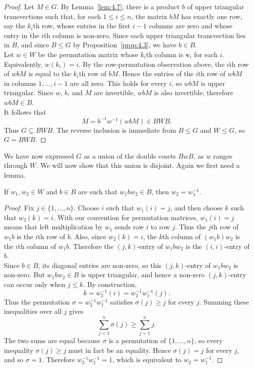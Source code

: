 \documentclass[../Odyssey_Project.tex]{subfiles}
\begin{document}
\begin{proof}
Let $M\in G$. By Lemma~\ref{lem:4.7}, there is a product $b$ of upper triangular transvections such that, for each $1\leq i\leq n$, the matrix $bM$ has exactly one row, say the $k_i$th row, whose entries in the first $i-1$ columns are zero and whose entry in the $i$th column is non-zero. Since each upper triangular transvection lies in $B$, and since $B\leq G$ by Proposition~\ref{prop:4.3}, we have $b\in B$.\\
Let $w\in W$ be the permutation matrix whose $k_i$th column is $\mathbf{v}_i$ for each $i$. Equivalently, $w(k_i)=i$. By the row-permutation observation above, the $i$th row of $wbM$ is equal to the $k_i$th row of $bM$. Hence the entries of the $i$th row of $wbM$ in columns $1,\ldots,i-1$ are all zero. This holds for every $i$, so $wbM$ is upper triangular. Since $w$, $b$, and $M$ are invertible, $wbM$ is also invertible; therefore $wbM\in B$.\\
It follows that
\[
    M=b^{-1}w^{-1}(wbM)\in BWB.
\]
Thus $G\subseteq BWB$. The reverse inclusion is immediate from $B\leq G$ and $W\leq G$, so $G=BWB$.
\end{proof}
We have now expressed $G$ as a union of the double cosets $BwB$, as $w$ ranges through $W$. We will now show that this union is disjoint. Again we first need a lemma.

\begin{lemma}
\label{lem:4.8}
If $w_1, w_2 \in W$ and $b \in B$ are such that $w_1 b w_2 \in B$, then $w_2 = w_1^{-1}$.
\end{lemma}

\begin{proof}
Fix $j\in\{1,\ldots,n\}$. Choose $i$ such that $w_1(i)=j$, and then choose $k$ such that $w_2(k)=i$. With our convention for permutation matrices, $w_1(i)=j$ means that left multiplication by $w_1$ sends row $i$ to row $j$. Thus the $j$th row of $w_1b$ is the $i$th row of $b$. Also, since $w_2(k)=i$, the $k$th column of $(w_1b)w_2$ is the $i$th column of $w_1b$. Therefore the $(j,k)$-entry of $w_1bw_2$ is the $(i,i)$-entry of $b$.\\
Since $b\in B$, its diagonal entries are non-zero, so this $(j,k)$-entry of $w_1bw_2$ is non-zero. But $w_1bw_2\in B$ is upper triangular, and hence a non-zero $(j,k)$-entry can occur only when $j\leq k$. By construction,
\[
    k=w_2^{-1}(i)=w_2^{-1}w_1^{-1}(j).
\]
Thus the permutation $\sigma=w_2^{-1}w_1^{-1}$ satisfies $\sigma(j)\geq j$ for every $j$. Summing these inequalities over all $j$ gives
\[
    \sum_{j=1}^n \sigma(j)\geq \sum_{j=1}^n j.
\]
The two sums are equal because $\sigma$ is a permutation of $\{1,\ldots,n\}$, so every inequality $\sigma(j)\geq j$ must in fact be an equality. Hence $\sigma(j)=j$ for every $j$, and so $\sigma=1$. Therefore $w_2^{-1}w_1^{-1}=1$, which is equivalent to $w_2=w_1^{-1}$.
\end{proof}
\end{document}
